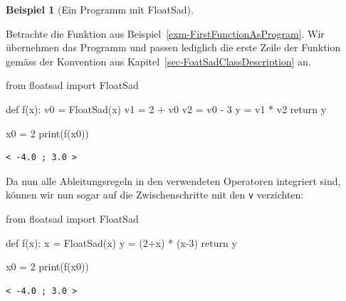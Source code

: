 \documentclass[
  letterpaper,
  DIV=11,
  oneside]{scrreprt}
\newenvironment{Shaded}{\begin{snugshade}}{\end{snugshade}}
\newcommand{\BuiltInTok}[1]{\textcolor[rgb]{0.00,0.23,0.31}{#1}}
\newcommand{\ControlFlowTok}[1]{\textcolor[rgb]{0.00,0.23,0.31}{#1}}
\newcommand{\DecValTok}[1]{\textcolor[rgb]{0.68,0.00,0.00}{#1}}
\newcommand{\ImportTok}[1]{\textcolor[rgb]{0.00,0.46,0.62}{#1}}
\newcommand{\KeywordTok}[1]{\textcolor[rgb]{0.00,0.23,0.31}{#1}}
\newcommand{\NormalTok}[1]{\textcolor[rgb]{0.00,0.23,0.31}{#1}}
\newcommand{\OperatorTok}[1]{\textcolor[rgb]{0.37,0.37,0.37}{#1}}
\theoremstyle{definition}
\theoremstyle{definition}
\newtheorem{example}{Beispiel}[chapter]
\theoremstyle{remark}
\begin{document}
\leavevmode{}%
\begin{example}[Ein Programm mit FloatSad]\label{exm-FloatSadUsage1}

Betrachte die Funktion aus Beispiel~\ref{exm-FirstFunctionAsProgram}.
Wir übernehmen das Programm und passen lediglich die erste Zeile der
Funktion gemäss der Konvention aus
Kapitel~\ref{sec-FoatSadClassDescription} an.

\begin{Shaded}
\begin{Highlighting}[]
\ImportTok{from}\NormalTok{ floatsad }\ImportTok{import}\NormalTok{ FloatSad}

\KeywordTok{def}\NormalTok{ f(x):}
\NormalTok{    v0 }\OperatorTok{=}\NormalTok{ FloatSad(x)}
\NormalTok{    v1 }\OperatorTok{=} \DecValTok{2} \OperatorTok{+}\NormalTok{ v0}
\NormalTok{    v2 }\OperatorTok{=}\NormalTok{ v0 }\OperatorTok{{-}} \DecValTok{3}
\NormalTok{    y }\OperatorTok{=}\NormalTok{ v1 }\OperatorTok{*}\NormalTok{ v2}
    \ControlFlowTok{return}\NormalTok{ y}

\NormalTok{x0 }\OperatorTok{=} \DecValTok{2}
\BuiltInTok{print}\NormalTok{(f(x0))}
\end{Highlighting}
\end{Shaded}

\begin{verbatim}
< -4.0 ; 3.0 >
\end{verbatim}

Da nun alle Ableitungsregeln in den verwendeten Operatoren integriert
sind, können wir nun sogar auf die Zwischenschritte mit den \texttt{v}
verzichten:

\begin{Shaded}
\begin{Highlighting}[]
\ImportTok{from}\NormalTok{ floatsad }\ImportTok{import}\NormalTok{ FloatSad}

\KeywordTok{def}\NormalTok{ f(x):}
\NormalTok{    x }\OperatorTok{=}\NormalTok{ FloatSad(x)}
\NormalTok{    y }\OperatorTok{=}\NormalTok{ (}\DecValTok{2}\OperatorTok{+}\NormalTok{x) }\OperatorTok{*}\NormalTok{ (x}\OperatorTok{{-}}\DecValTok{3}\NormalTok{)}
    \ControlFlowTok{return}\NormalTok{ y}

\NormalTok{x0 }\OperatorTok{=} \DecValTok{2}
\BuiltInTok{print}\NormalTok{(f(x0))}
\end{Highlighting}
\end{Shaded}

\begin{verbatim}
< -4.0 ; 3.0 >
\end{verbatim}

\end{example}
\end{document}
